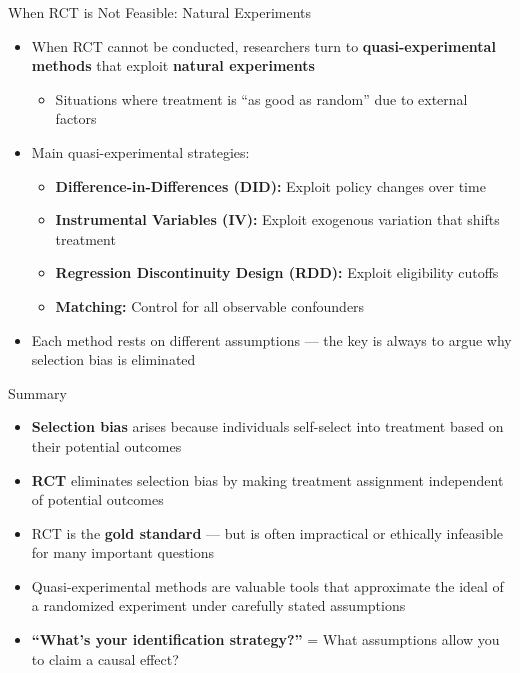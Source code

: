\documentclass[hyperref={pdfpagelabels=false}]{beamer}
\begin{document}
	\begin{frame}{When RCT is Not Feasible: Natural Experiments}
		\begin{itemize}
			\item When RCT cannot be conducted, researchers turn to \textbf{quasi-experimental methods} that exploit \textbf{natural experiments}
			\vspace{0.2cm}
			\begin{itemize}
				\item Situations where treatment is ``as good as random'' due to external factors
			\end{itemize}
			\vspace{0.3cm}
			\item Main quasi-experimental strategies:
			\vspace{0.2cm}
			\begin{itemize}
				\item \textbf{Difference-in-Differences (DID):} Exploit policy changes over time
				\vspace{0.2cm}
				\item \textbf{Instrumental Variables (IV):} Exploit exogenous variation that shifts treatment
				\vspace{0.2cm}
				\item \textbf{Regression Discontinuity Design (RDD):} Exploit eligibility cutoffs
				\vspace{0.2cm}
				\item \textbf{Matching:} Control for all observable confounders
			\end{itemize}
			\vspace{0.2cm}
			\item Each method rests on different assumptions --- the key is always to argue why selection bias is eliminated
		\end{itemize}
	\end{frame}
	
	\begin{frame}{Summary}
		\begin{itemize}
			\item \textbf{Selection bias} arises because individuals self-select into treatment based on their potential outcomes
			\vspace{0.3cm}
			\item \textbf{RCT} eliminates selection bias by making treatment assignment independent of potential outcomes
			\vspace{0.3cm}
			\item RCT is the \textbf{gold standard} --- but is often impractical or ethically infeasible for many important questions
			\vspace{0.3cm}
			\item Quasi-experimental methods are valuable tools that approximate the ideal of a randomized experiment under carefully stated assumptions
			\vspace{0.3cm}
			\item \textbf{``What's your identification strategy?''} = What assumptions allow you to claim a causal effect?
		\end{itemize}
	\end{frame}
	
\end{document}
